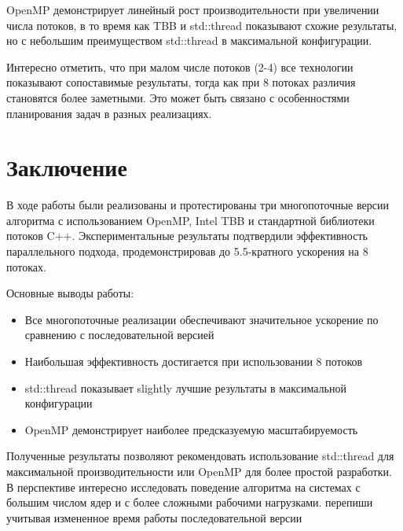 \documentclass[12pt]{article}
\begin{document}
\hspace*{1.25em}OpenMP демонстрирует линейный рост производительности при увеличении числа потоков, в то время как TBB и std::thread показывают схожие результаты, но с небольшим преимуществом std::thread в максимальной конфигурации.

\hspace*{1.25em}Интересно отметить, что при малом числе потоков (2-4) все технологии показывают сопоставимые результаты, тогда как при 8 потоках различия становятся более заметными. Это может быть связано с особенностями планирования задач в разных реализациях.

\section{Заключение}

\hspace*{1.25em}В ходе работы были реализованы и протестированы три многопоточные версии алгоритма с использованием OpenMP, Intel TBB и стандартной библиотеки потоков C++. Экспериментальные результаты подтвердили эффективность параллельного подхода, продемонстрировав до 5.5-кратного ускорения на 8 потоках.

\hspace*{1.25em}Основные выводы работы:
\begin{itemize}
\item Все многопоточные реализации обеспечивают значительное ускорение по сравнению с последовательной версией
\item Наибольшая эффективность достигается при использовании 8 потоков
\item std::thread показывает slightly лучшие результаты в максимальной конфигурации
\item OpenMP демонстрирует наиболее предсказуемую масштабируемость
\end{itemize}

\hspace*{1.25em}Полученные результаты позволяют рекомендовать использование std::thread для максимальной производительности или OpenMP для более простой разработки. В перспективе интересно исследовать поведение алгоритма на системах с большим числом ядер и с более сложными рабочими нагрузками. перепиши учитывая измененное время работы последовательной версии
\end{document}
